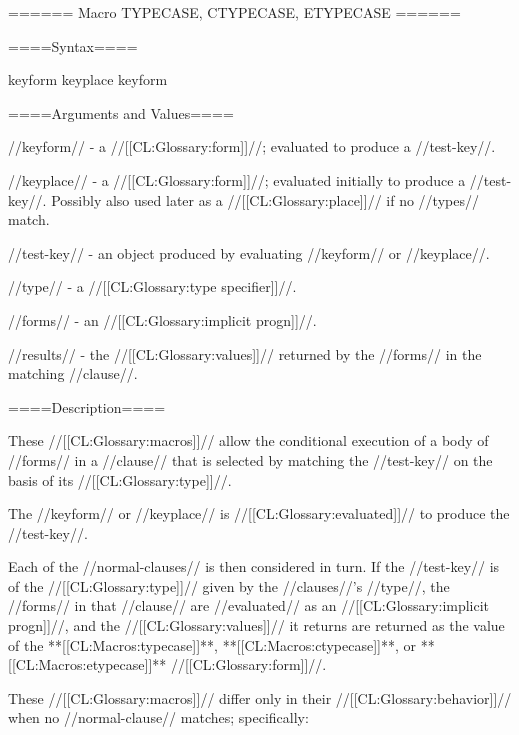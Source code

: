 ====== Macro TYPECASE, CTYPECASE, ETYPECASE ======

====Syntax====

 {keyform  } {}  {keyplace } {}  {keyform } {}

   

====Arguments and Values====

//keyform// - a //[[CL:Glossary:form]]//; evaluated to produce a //test-key//.

//keyplace// - a //[[CL:Glossary:form]]//; evaluated initially to produce a //test-key//. Possibly also used later as a //[[CL:Glossary:place]]// if no //types// match.

//test-key// - an object produced by evaluating //keyform// or //keyplace//.

//type// - a //[[CL:Glossary:type specifier]]//.

//forms// - an //[[CL:Glossary:implicit progn]]//.

//results// - the //[[CL:Glossary:values]]// returned by the //forms// in the matching //clause//.

====Description====

These //[[CL:Glossary:macros]]// allow the conditional execution of a body of //forms// in a //clause// that is selected by matching the //test-key// on the basis of its //[[CL:Glossary:type]]//.

The //keyform// or //keyplace// is //[[CL:Glossary:evaluated]]// to produce the //test-key//.

Each of the //normal-clauses// is then considered in turn. If the //test-key// is of the //[[CL:Glossary:type]]// given by the //clauses//'s //type//, the //forms// in that //clause// are //evaluated// as an //[[CL:Glossary:implicit progn]]//, and the //[[CL:Glossary:values]]// it returns are returned as the value of the **[[CL:Macros:typecase]]**, **[[CL:Macros:ctypecase]]**, or **[[CL:Macros:etypecase]]** //[[CL:Glossary:form]]//.

These //[[CL:Glossary:macros]]// differ only in their //[[CL:Glossary:behavior]]// when no //normal-clause// matches; specifically:

